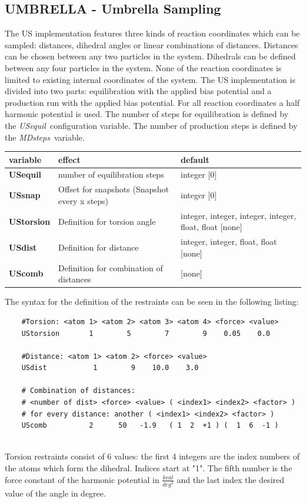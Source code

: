 \documentclass[10pt,a4paper]{article} %
\begin{document}
	\subsection{UMBRELLA - Umbrella Sampling} \label{sec:umbrella}
	The \acf{US}\supercite{umbrellasampling1, umbrellasampling2, umbrellasamplingreview} implementation features three kinds of reaction coordinates which can be sampled: distances, dihedral angles or linear combinations of distances. Distances can be chosen between any two particles in the system. Dihedrals can be defined between any four particles in the system. None of the reaction coordinates is limited to existing internal coordinates of the system.
	The \acl{US} implementation is divided into two parts: equilibration with the applied bias potential and a production run with the applied bias potential. For all reaction coordinates a half harmonic potential is used. The number of steps for equilibration is defined by the \glqq\textit{USequil}\grqq~configuration variable. The number of production steps is defined by the \glqq\textit{MDsteps}\grqq~variable.

	\begin{longtable}{|p{3cm}|p{5cm}|p{3cm}|}
		variable & effect & default \\
		\hline
		\textbf{USequil} & number of equilibration steps & integer [0] \\
		\textbf{USsnap} & Offset for snapshots (Snapshot every x steps) & integer [0]  \\
		\textbf{UStorsion} & Definition for torsion angle & integer, integer, integer, integer, float, float [none] \\
		\textbf{USdist} & Definition for distance & integer, integer, float, float [none] \\
		\textbf{UScomb} & Definition for combination of distances & [none] \\
	\end{longtable}

	The syntax for the definition of the restraints can be seen in the following listing:\\
    
	\begin{lstlisting}
	#Torsion: <atom 1> <atom 2> <atom 3> <atom 4> <force> <value>
	UStorsion       1        5        7        9    0.05    0.0
	
	#Distance: <atom 1> <atom 2> <force> <value>
	USdist           1        9    10.0    3.0
	
	# Combination of distances:
	# <number of dist> <force> <value> ( <index1> <index2> <factor> ) 
	# for every distance: another ( <index1> <index2> <factor> ) 
	UScomb          2      50   -1.9   ( 1  2  +1 ) (  1  6  -1 )
	\end{lstlisting}
	~\\
	Torsion restraints consist of 6 values: the first 4 integers are the index numbers of the atoms which form the dihedral. Indices start at "1". The fifth number is the force constant of the harmonic potential in $\frac{kcal}{deg^2}$ and the last index the desired value of the angle in degree.
	
\end{document}

